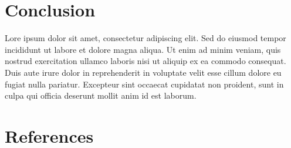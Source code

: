 \documentclass[
  11pt,
  a4paper,
  DIV=11,
  numbers=noendperiod]{scrartcl}
\begin{document}
\begin{table}[H]

\caption{\label{tbl-3}The Second Table}


\end{table}%

\section{Conclusion}\label{conclusion}

Lore ipsum dolor sit amet, consectetur adipiscing elit. Sed do eiusmod
tempor incididunt ut labore et dolore magna aliqua. Ut enim ad minim
veniam, quis nostrud exercitation ullamco laboris nisi ut aliquip ex ea
commodo consequat. Duis aute irure dolor in reprehenderit in voluptate
velit esse cillum dolore eu fugiat nulla pariatur. Excepteur sint
occaecat cupidatat non proident, sunt in culpa qui officia deserunt
mollit anim id est laborum.

\newpage{}

\section{References}\label{references}

\label{refs}
\end{document}
